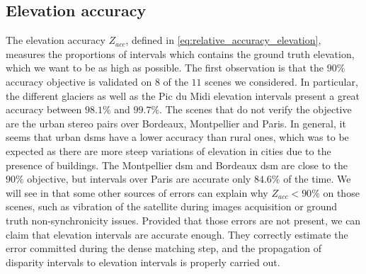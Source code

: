 \subsection{Elevation accuracy}
The elevation accuracy $Z_{acc}$, defined in \cref{eq:relative_accuracy_elevation}, measures the proportions of intervals which contains the ground truth elevation, which we want to be as high as possible. The first observation is that the $90\%$ accuracy objective is validated on $8$ of the $11$ scenes we considered. In particular, the different glaciers as well as the Pic du Midi elevation intervals present a great accuracy between $98.1\%$ and $99.7\%$. The scenes that do not verify the objective are the urban stereo pairs over Bordeaux, Montpellier and Paris. In general, it seems that urban \acrshort{dsm}s have a lower accuracy than rural ones, which was to be expected as there are more steep variations of elevation in cities due to the presence of buildings. The Montpellier \acrshort{dsm} and Bordeaux \acrshort{dsm} are close to the $90\%$ objective, but intervals over Paris are accurate only $84.6\%$ of the time. We will see in  that some other sources of errors can explain why $Z_{acc}<90\%$ on those scenes, such as vibration of the satellite during images acquisition or ground truth non-synchronicity issues. Provided that those errors are not present, we can claim that elevation intervals are accurate enough. They correctly estimate the error committed during the dense matching step, and the propagation of disparity intervals to elevation intervals is properly carried out.

